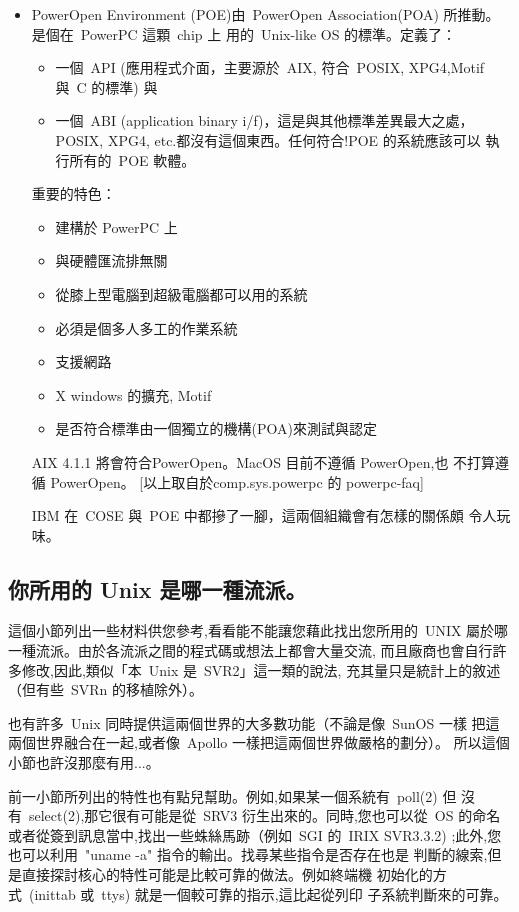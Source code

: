 \documentclass{article}
\begin{document}
\begin{CJK*}{Bg5}{ming}
\begin{itemize}
      \item PowerOpen Environment (POE)由~PowerOpen Association(POA) 所推動。
        是個在~PowerPC 這顆~chip 上 用的~Unix-like OS 的標準。定義了： 
	\begin{itemize}
        \item 一個~API (應用程式介面，主要源於~AIX, 符合~POSIX,
          XPG4,Motif 與~C 的標準) 與
        \item 一個~ABI (application binary i/f)，這是與其他標準差異最大之處，
          POSIX, XPG4, etc.都沒有這個東西。任何符合!POE 的系統應該可以
          執行所有的~POE 軟體。
	\end{itemize}
        重要的特色：
	\begin{itemize}
        \item 建構於 PowerPC 上
        \item 與硬體匯流排無關
        \item 從膝上型電腦到超級電腦都可以用的系統
        \item 必須是個多人多工的作業系統
        \item 支援網路
        \item X windows 的擴充, Motif
        \item 是否符合標準由一個獨立的機構(POA)來測試與認定
	\end{itemize}
        AIX 4.1.1 將會符合PowerOpen。MacOS 目前不遵循 PowerOpen,也
        不打算遵循 PowerOpen。
        [以上取自於comp.sys.powerpc 的 powerpc-faq]

        IBM 在~COSE 與~POE 中都摻了一腳，這兩個組織會有怎樣的關係頗
        令人玩味。
\end{itemize}

\subsection{你所用的 Unix 是哪一種流派。}

    這個小節列出一些材料供您參考,看看能不能讓您藉此找出您所用的~UNIX
    屬於哪一種流派。由於各流派之間的程式碼或想法上都會大量交流,
    而且廠商也會自行許多修改,因此,類似「本~Unix 是~SVR2」這一類的說法,
    充其量只是統計上的敘述（但有些~SVRn 的移植除外）。

    也有許多~Unix 同時提供這兩個世界的大多數功能（不論是像~SunOS 一樣
    把這兩個世界融合在一起,或者像~Apollo 一樣把這兩個世界做嚴格的劃分）。
    所以這個小節也許沒那麼有用...。

    前一小節所列出的特性也有點兒幫助。例如,如果某一個系統有~poll(2) 但
    沒有~select(2),那它很有可能是從~SRV3 衍生出來的。同時,您也可以從~OS
    的命名或者從簽到訊息當中,找出一些蛛絲馬跡（例如~SGI 的~IRIX SVR3.3.2)
    ;此外,您也可以利用~"uname -a" 指令的輸出。找尋某些指令是否存在也是
    判斷的線索,但是直接探討核心的特性可能是比較可靠的做法。例如終端機
    初始化的方式~(inittab 或~ttys) 就是一個較可靠的指示,這比起從列印
    子系統判斷來的可靠。


\end{CJK*}
\end{document}
